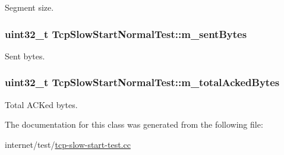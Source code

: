 Segment size. 

\subsubsection[{\texorpdfstring{m\+\_\+sent\+Bytes}{m_sentBytes}}]{\setlength{\rightskip}{0pt plus 5cm}uint32\+\_\+t Tcp\+Slow\+Start\+Normal\+Test\+::m\+\_\+sent\+Bytes\hspace{0.3cm}{\ttfamily [protected]}}\hypertarget{classTcpSlowStartNormalTest_ac1fa24a51c073dbc9727c46409a7c86b}{}\label{classTcpSlowStartNormalTest_ac1fa24a51c073dbc9727c46409a7c86b}


Sent bytes. 

\subsubsection[{\texorpdfstring{m\+\_\+total\+Acked\+Bytes}{m_totalAckedBytes}}]{\setlength{\rightskip}{0pt plus 5cm}uint32\+\_\+t Tcp\+Slow\+Start\+Normal\+Test\+::m\+\_\+total\+Acked\+Bytes\hspace{0.3cm}{\ttfamily [protected]}}\hypertarget{classTcpSlowStartNormalTest_ac8401e0be3bf91fa46b08246e3263f50}{}\label{classTcpSlowStartNormalTest_ac8401e0be3bf91fa46b08246e3263f50}


Total A\+C\+Ked bytes. 



The documentation for this class was generated from the following file\+:\begin{DoxyCompactItemize}
\item 
internet/test/\hyperlink{tcp-slow-start-test_8cc}{tcp-\/slow-\/start-\/test.\+cc}\end{DoxyCompactItemize}
